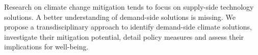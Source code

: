 Research on climate change mitigation tends to focus on supply-side technology solutions. A better understanding of demand-side solutions is missing. We propose a transdisciplinary approach to identify demand-side climate solutions, investigate their mitigation potential, detail policy measures and assess their implications for well-being.

